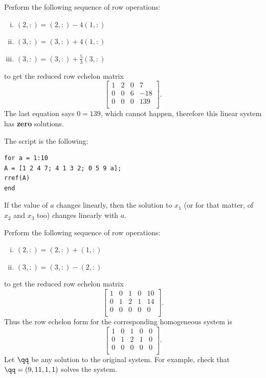 \vspace{2mm}
Perform the following sequence of row operations:
\begin{enumerate}[i)]
\item $(2,:) = (2,:) - 4(1,:)$
\item $(3,:) = (3,:) + 4(1,:)$
\item $(3,:) = (3,:) + \frac{5}{3}(3,:)$
\end{enumerate}
to get the reduced row echelon matrix
$$
\left[\begin{array}{ccc|c}
     1 & 2 & 0 & 7 \\
		 0 & 0 & 6 & -18\\
		 0 & 0 & 0  & 139\\
      \end{array}\right].
$$
The last equation says $0=139$, which cannot happen, therefore this linear system has \textbf{zero} solutions.

\vspace{2mm}
The script is the following:
\begin{verbatim}
for a = 1:10
A = [1 2 4 7; 4 1 3 2; 0 5 9 a];
rref(A)
end
\end{verbatim}
If the value of $a$ changes linearly, then the solution to $x_1$ (or for that matter, of $x_2$ and $x_3$ too) changes linearly with $a$.

\vspace{2mm}
Perform the following sequence of row operations:
\begin{enumerate}[i)]
\item $(2,:) = (2,:) + (1,:)$
\item $(3,:) = (3,:) - (2,:)$
\end{enumerate}
to get the reduced row echelon matrix
$$
\left[\begin{array}{cccc|c}
     1 & 0 & 1 & 0 & 10 \\
		 0 & 1 & 2 & 1 & 14\\
		 0 & 0 & 0 & 0 & 0\\
      \end{array}\right].
$$
Thus the row echelon form for the corresponding homogeneous system is
$$
\left[\begin{array}{cccc|c}
     1 & 0 & 1 & 0 & 0 \\
		 0 & 1 & 2 & 1 & 0\\
		 0 & 0 & 0 & 0 & 0\\
      \end{array}\right].
$$
Let $\qq$ be any solution to the original system. For example, check that $\qq = (9,11,1,1)$ solves the system.


